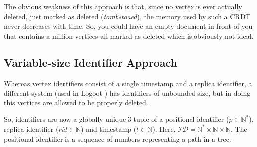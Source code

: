\documentclass[diss.tex]{subfiles}
\begin{document}
The obvious weakness of this approach is that, since no vertex is ever actually deleted, just marked as deleted (\textit{tombstoned}), the memory used by such a CRDT never decreases with time. So, you could have an empty document in front of you that contains a million vertices all marked as deleted which is obviously not ideal.

\subsection{Variable-size Identifier Approach}
Whereas vertex identifiers consist of a single timestamp and a replica identifier, a different system (used in Logoot \cite{logoot}) has identifiers of unbounded size, but in doing this vertices are allowed to be properly deleted.

So, identifiers are now a globally unique 3-tuple of a positional identifier ($p \in \mathbb{N^*}$), replica identifier ($rid \in \mathbb{N}$) and timestamp ($t \in \mathbb{N}$). Here, $\mathcal{ID} = \mathbb{N^*} \times \mathbb{N} \times \mathbb{N} $. The positional identifier is a sequence of numbers representing a path in a tree.
\end{document}

